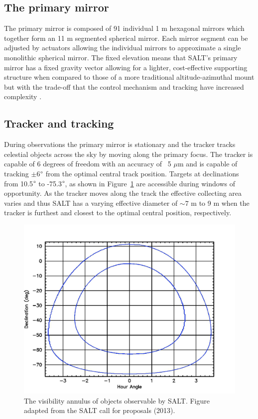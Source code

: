 \subsection{The primary mirror}

The primary mirror is composed of 91 individual 1 m hexagonal mirrors which together form an 11 m segmented spherical mirror. Each mirror segment can be adjusted by actuators allowing the individual mirrors to approximate a single monolithic spherical mirror. The fixed elevation means that SALT's primary mirror has a fixed gravity vector allowing for a lighter, cost-effective supporting structure when compared to those of a more traditional altitude-azimuthal mount but with the trade-off that the control mechanism and tracking have increased complexity \citep{SALT_design}.

\subsection{Tracker and tracking}

During observations the primary mirror is stationary and the tracker tracks celestial objects across the sky by moving along the primary focus. The tracker is capable of 6 degrees of freedom with an accuracy of ~5 $\mu$m and is capable of tracking $\pm$6$\degree$ from the optimal central track position. Targets at declinations from 10.5$\degree$ to -75.3$\degree$, as shown in Figure~\ref{fig:SALT_visibility} are accessible during windows of opportunity. As the tracker moves along the track the effective collecting area varies and thus SALT has a varying effective diameter of $\sim7$ m to 9 m when the tracker is furthest and closest to the optimal central position, respectively.

\begin{figure}[t]
    \centering
    \includegraphics[width = 1.0 \textwidth]{figures/2_SALT_visibility.png}
    \caption{The visibility annulus of objects observable by SALT. Figure adapted from the SALT call for proposals (2013).\protect\footnotemark}
    \label{fig:SALT_visibility}
\end{figure}

